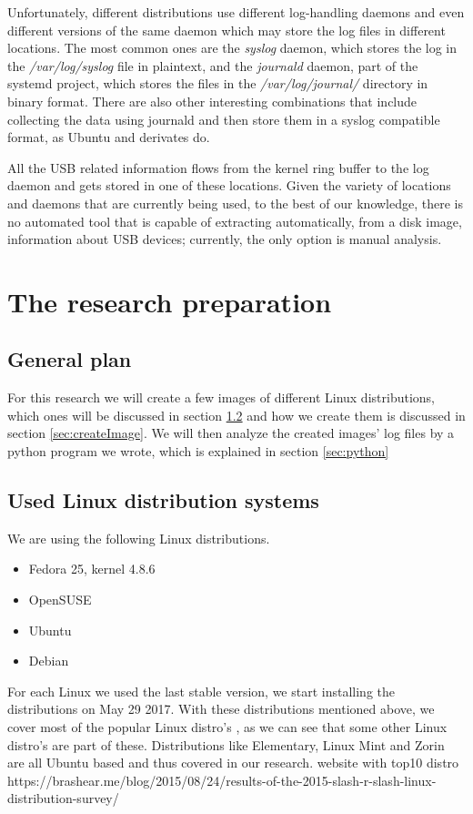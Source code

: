 \documentclass[a4paper]{article}
\begin{document}
Unfortunately, different distributions use different log-handling daemons and
even different versions of the same daemon which may store the log files in
different locations. The most common ones are the \emph{syslog} daemon, which
stores the log in the \emph{/var/log/syslog} file in plaintext, and the
\emph{journald} daemon, part of the systemd project, which stores the files in
the \emph{/var/log/journal/} directory in binary format. There are also other
interesting combinations that include collecting the data using journald and
then store them in a syslog compatible format, as Ubuntu and derivates
do.~\cite{poettering2012journal}

All the USB related information flows from the kernel ring buffer to the log
daemon and gets stored in one of these locations. Given the variety of locations
and daemons that are currently being used, to the best of our knowledge, there
is no automated tool that is capable of extracting automatically, from a disk
image, information about USB devices; currently, the only option is manual
analysis.

\section{The research preparation}
\label{sec:resprep}
\subsection{General plan}
For this research we will create a few images of different Linux distributions,
which ones will be discussed in section \ref{sec:usedLinux} and how we create
them is discussed in section \ref{sec:createImage}. We will then analyze the
created images' log files by a python program we wrote, which is explained in
section \ref{sec:python}

\subsection{Used Linux distribution systems}\label{sec:usedLinux}
We are using the following Linux distributions.
\begin{itemize}
\item Fedora 25, kernel 4.8.6
\item OpenSUSE
\item Ubuntu
\item Debian
\end{itemize}
For each Linux we used the last stable version, we start installing the
distributions on May 29 2017. With these distributions mentioned above, we cover
most of the popular Linux distro's \cite{LinuxDistro}, as we can see that some
other Linux distro's are part of these. Distributions like Elementary, Linux
Mint and  Zorin are all Ubuntu based and thus covered in our research. %
website with top10 distro
https://brashear.me/blog/2015/08/24/results-of-the-2015-slash-r-slash-linux-distribution-survey/
\end{document}
